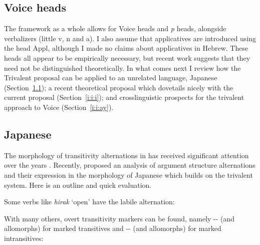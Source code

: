 \begin{exe}
\begin{xlist}
\begin{xlist}
\begin{xlist}
\begin{xlist}
\begin{xlist}
\begin{xlist}
\begin{exe}
\begin{xlist}
\begin{exe}
\begin{exe}
\begin{xlist}
\begin{exe}
\section{Voice heads} \label{i:i}
The framework as a whole allows for Voice heads and \emph{p} heads, alongside verbalizers (little v, n and a). I also assume that applicatives are introduced using the head Appl, although I made no claims about applicatives in Hebrew. These heads all appear to be empirically necessary, but recent work suggests that they need not be distinguished theoretically. In what comes next I review how the Trivalent proposal can be applied to an unrelated language, Japanese (Section~\ref{i:i:jap}); a recent theoretical proposal which dovetails nicely with the current proposal (Section~\ref{i:i:i}); and crosslinguistic prospects for the trivalent approach to Voice (Section~\ref{i:i:ay}).

	\subsection{Japanese} \label{i:i:jap}
The morphology of transitivity alternations in  has received significant attention over the years \citep{suga80,jacobsen92,miyagawa98,nishiyama98,volpe05,harley08}. Recently, \cite{oseki17nyu} proposed an analysis of argument structure alternations and their expression in the morphology of Japanese which builds on the trivalent system. Here is an outline and quick evaluation.

Some verbs like \emph{hirak} `open' have the labile alternation:
 \begin{exe}
 \ex  {}
 \begin{xlist} 
	
	
 \z
\z 

With many others, overt transitivity markers can be found, namely -- (and allomorphs) for marked transitives and -- (and allomorphs) for marked intransitives:
 \begin{exe}
 \ex  
 \begin{xlist} 
	

\end{xlist}
\end{exe}
\end{xlist}
\end{exe}
\end{exe}
\end{xlist}
\end{exe}
\end{exe}
\end{xlist}
\end{exe}
\end{xlist}
\end{xlist}
\end{xlist}
\end{xlist}
\end{xlist}
\end{xlist}
\end{exe}
